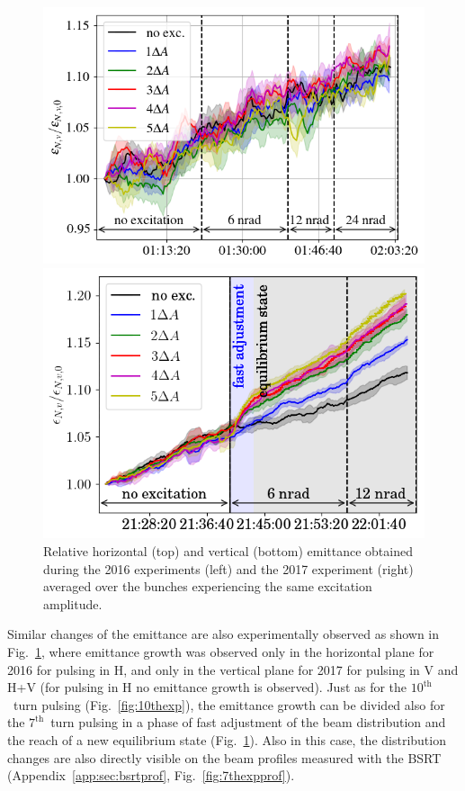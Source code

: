 \documentclass[%
 reprint,
 amsmath,amssymb,
 aps,
prstab,
]{revtex4-1}
\begin{document}
\begin{figure}[h]
\begin{minipage}[t]{0.49\linewidth}
	\end{minipage}	
	\begin{minipage}[t]{0.49\linewidth}
		\centering
		\includegraphics[width=1.0\linewidth]{2016_emitv_avg_rel_h7th_no_damper.png}
	\end{minipage}	
	\begin{minipage}[t]{0.49\linewidth}
		\centering
		\includegraphics[width=1.0\linewidth]{2017_emitv_avg_rel_hv7th_no_damper.png}
	\end{minipage}	
	\caption{\label{fig:7thexp} Relative horizontal (top) and vertical (bottom) emittance obtained during the 2016 experiments (left) and the 2017 experiment (right) averaged over the bunches experiencing the same excitation amplitude.}
\end{figure}
Similar changes of the emittance are also experimentally observed as shown in Fig.~\ref{fig:7thexp}, where emittance growth was observed only in the horizontal plane for 2016 for pulsing in H, and only in the vertical plane for 2017 for pulsing in V and H+V (for pulsing in H no emittance growth is observed). Just as for the $10^{\mathrm{th}}$~turn pulsing (Fig.~\ref{fig:10thexp}), the emittance growth can be divided also for the $7^{\mathrm{th}}$~turn pulsing in a phase of fast adjustment of the beam distribution and the reach of a new equilibrium state (Fig.~\ref{fig:7thexp}). Also in this case, the distribution changes are also directly visible on the beam profiles measured with the BSRT (Appendix~\ref{app:sec:bsrtprof}, Fig.~\ref{fig:7thexpprof}).
\end{document}
